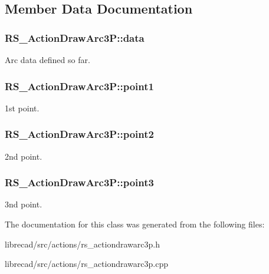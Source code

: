 \subsection{Member Data Documentation}
\hypertarget{classRS__ActionDrawArc3P_a56fdac87099d7dc36c415259a3abfc6f}{
\subsubsection[{data}]{ R\-S\-\_\-\-Action\-Draw\-Arc3\-P\-::data\hspace{0.3cm}{\ttfamily [protected]}}}\label{classRS__ActionDrawArc3P_a56fdac87099d7dc36c415259a3abfc6f}
Arc data defined so far. \hypertarget{classRS__ActionDrawArc3P_a27089018ee7feb634c14dc1fa244ef9b}{
\subsubsection[{point1}]{ R\-S\-\_\-\-Action\-Draw\-Arc3\-P\-::point1\hspace{0.3cm}{\ttfamily [protected]}}}\label{classRS__ActionDrawArc3P_a27089018ee7feb634c14dc1fa244ef9b}
1st point. \hypertarget{classRS__ActionDrawArc3P_ac7152c096710a554ca2979634f9de54f}{
\subsubsection[{point2}]{ R\-S\-\_\-\-Action\-Draw\-Arc3\-P\-::point2\hspace{0.3cm}{\ttfamily [protected]}}}\label{classRS__ActionDrawArc3P_ac7152c096710a554ca2979634f9de54f}
2nd point. \hypertarget{classRS__ActionDrawArc3P_a60d7c64707814a9eceb03e674da08fcd}{
\subsubsection[{point3}]{ R\-S\-\_\-\-Action\-Draw\-Arc3\-P\-::point3\hspace{0.3cm}{\ttfamily [protected]}}}\label{classRS__ActionDrawArc3P_a60d7c64707814a9eceb03e674da08fcd}
3nd point. 

The documentation for this class was generated from the following files\-:\begin{DoxyCompactItemize}
\item 
librecad/src/actions/rs\-\_\-actiondrawarc3p.\-h\item 
librecad/src/actions/rs\-\_\-actiondrawarc3p.\-cpp\end{DoxyCompactItemize}
